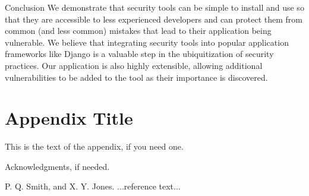 \documentclass{sigplanconf}
\begin{document}
Conclusion
We demonstrate that security tools can be simple to install and use so that they are accessible to less experienced developers and can protect them from common (and less common) mistakes that lead to their application being vulnerable. We believe that integrating security tools into popular application frameworks like Django is a valuable step in the ubiquitization of security practices. Our application is also highly extensible, allowing additional vulnerabilities to be added to the tool as their importance is discovered. 


\appendix
\section{Appendix Title}

This is the text of the appendix, if you need one.

\acks

Acknowledgments, if needed.





\begin{thebibliography}{}
\softraggedright

P. Q. Smith, and X. Y. Jones. ...reference text...

\end{thebibliography}
\end{document}
